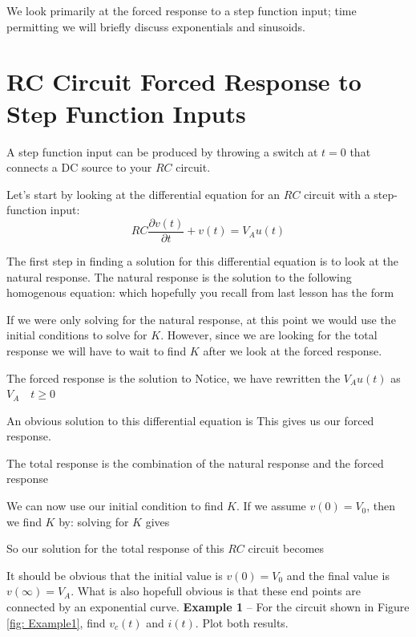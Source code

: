 \documentclass{handout}
\begin{document}
We look primarily at the forced response to a step function input; time permitting we will briefly discuss exponentials and sinusoids.

\section{RC Circuit Forced Response to Step Function Inputs}
A step function input can be produced by throwing a switch at $t=0$ that connects a DC source to your $RC$ circuit.

Let's start by looking at the differential equation for an $RC$ circuit with a step-function input:
\begin{equation}
RC\frac{\partial v(t)}{\partial t}+v(t) = V_Au(t)
\end{equation}

The first step in finding a solution for this differential equation is to look at the natural response.  The natural response is the solution to the following homogenous equation:
which hopefully you recall from last lesson has the form

If we were only solving for the natural response, at this point we would use the initial conditions to solve for $K$.  However, since we are looking for the total response we will have to wait to find $K$ after we look at the forced response.

The forced response is the solution to 
Notice, we have rewritten the $V_Au(t)$ as $V_A \quad t\ge0$

An obvious solution to this differential equation is
This gives us our forced response.

The total response is the combination of the natural response and the forced response

We can now use our initial condition to find $K$. If we assume $v(0) = V_0$, then we find $K$ by:
solving for $K$ gives

So our solution for the total response of this $RC$ circuit becomes

It should be obvious that the initial value is $v(0) = V_0$ and the final value is $v(\infty) = V_A$. What is also hopefull obvious is that these end points are connected by an exponential curve.
\newpage
\clearpage
\pagebreak
\textbf{Example 1} -- For the circuit shown in Figure \ref{fig: Example1}, find $v_c(t)$ and $i(t)$.  Plot both results.
\end{document}

